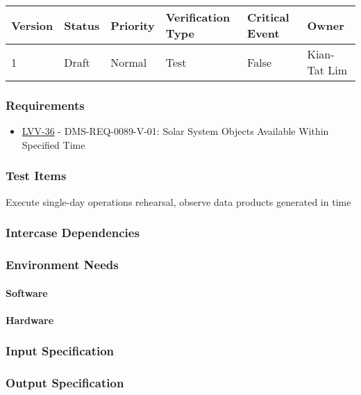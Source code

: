 \begin{longtable}[]{llllll}
\toprule
Version & Status & Priority & Verification Type & Critical Event & Owner
\\\midrule
1 & Draft & Normal &
Test & False & Kian-Tat Lim
\\\bottomrule
\end{longtable}

\subsubsection{Requirements}
\begin{itemize}
\item \href{https://jira.lsstcorp.org/browse/LVV-36}{LVV-36} - DMS-REQ-0089-V-01: Solar System Objects Available Within Specified Time
\end{itemize}

\subsubsection{Test Items}
Execute single-day operations rehearsal, observe data products generated
in time



\subsubsection{Intercase Dependencies}

\subsubsection{Environment Needs}

\paragraph{Software}

\paragraph{Hardware}

\subsubsection{Input Specification}

\subsubsection{Output Specification}


